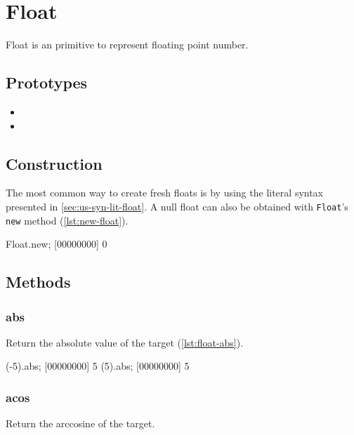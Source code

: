 \section{Float}

Float is an \us primitive to represent floating point number.

\subsection{Prototypes}

\begin{itemize}
\item {}
\item {}
\end{itemize}

\subsection{Construction}

The most common way to create fresh floats is by using the literal
syntax presented in \autoref{sec:us-syn-lit-float}. A null float can also be
obtained with \lstinline|Float|'s \lstinline|new| method
(\autoref{lst:new-float}).

\begin{urbiscript}[caption=Creating a new float, label=lst:new-float,
  float=\floatpos]
Float.new;
[00000000] 0
\end{urbiscript}

\subsection{Methods}

\subsubsection{abs}

Return the absolute value of the target (\autoref{lst:float-abs}).

\begin{urbiscript}[caption=Float.abs, label=lst:float-abs]
(-5).abs;
[00000000] 5
(5).abs;
[00000000] 5
\end{urbiscript}

\subsubsection{acos}

Return the arccosine of the target.

